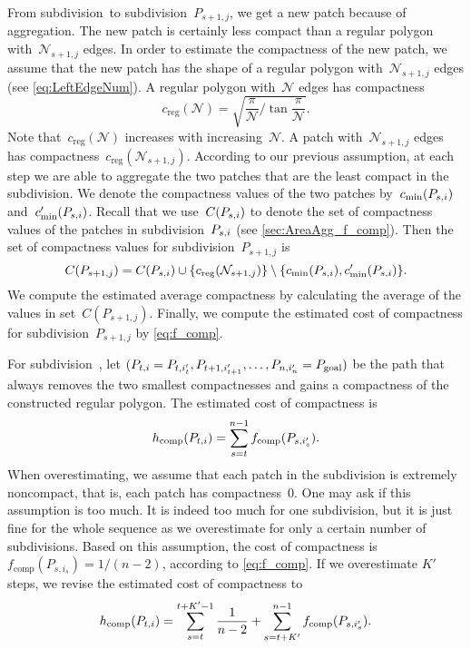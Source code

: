 From subdivision~\Psnode to subdivision~$P_{s+1,j}$,
we get a new patch because of aggregation.
The new patch is certainly less compact than a regular polygon 
with~$\mathcal{N}_{s+1,j}$ edges.
In order to estimate the compactness of the new patch, 
we assume that 
the new patch has the shape of a regular polygon 
with~$\mathcal{N}_{s+1,j}$ edges 
(see \eq\ref{eq:LeftEdgeNum}).
A regular polygon with~$\mathcal{N}$ edges has compactness
\begin{equation*}
\label{eq:comp_regular}
c_\mathrm{reg}(\mathcal{N})=
\sqrt{\frac{\pi}{\mathcal{N}} \bigg/
	\tan{\frac{\pi}{\mathcal{N}}}}.
\end{equation*}
Note that~$c_\mathrm{reg}(\mathcal{N})$ increases 
with increasing~$\mathcal{N}$.
A patch with~$\mathcal{N}_{s+1,j}$ edges has
compactness~$c_\mathrm{reg} (\mathcal{N}_{s+1,j})$.
According to our previous assumption, 
at each step we are able to aggregate the two patches 
that are the least compact in the subdivision.
We denote the compactness values of the two patches
by~$c_\mathrm{min}(P_{s,i})$ and~$c'_\mathrm{min}(P_{s,i})$.
Recall that we use~$C(P_{s,i})$ to denote 
the set of compactness values of the patches
in subdivision~$P_{s,i}$ 
(see \sect\ref{sec:AreaAgg_f_comp}).
Then the set of compactness values 
for subdivision~$P_{s+1,j}$ is 
\begin{equation}
\label{eq:compsetnew}
C(P_{s+1,j})=
C(P_{s,i})\cup 
\{c_\mathrm{reg} (\mathcal{N}_{s+1,j})\}
\setminus \{c_\mathrm{min}(P_{s,i}), c'_\mathrm{min}(P_{s,i})\}.
\nonumber
\end{equation}
We compute the estimated average compactness 
by calculating the average 
of the values in set~$C(P_{s+1,j})$.
Finally, we compute the estimated cost of compactness 
for subdivision~$P_{s+1,j}$ by \eq\ref{eq:f_comp}.

For subdivision~\Pnode, let
$(P_{t,i}=P_{t,i'_t}, P_{t+1,i'_{t+1}}, 
\dots,P_{n,i'_n}=P_\mathrm{goal})$
be the path that always removes the two smallest compactnesses
and gains a compactness of the constructed regular polygon.
The estimated cost of compactness is
\begin{equation}
\label{eq:h_comp}
h_\mathrm{comp}(P_{t,i})=
\sum_{s=t}^{n-1}f_\mathrm{comp}(P_{s,i'_s}). \nonumber
\end{equation}
When overestimating, we assume that 
each patch in the subdivision is extremely noncompact,
that is, each patch has compactness~$0$.
One may ask if this assumption is too much.
It is indeed too much for one subdivision, 
but it is just fine for the whole sequence
as we overestimate for only a certain number of subdivisions.
Based on this assumption,
the cost of compactness is $f_\mathrm{comp}(P_{s,i_s})=1/(n-2)$,
according to \eq\ref{eq:f_comp}.
If we overestimate $K'$ steps, 
we revise the estimated cost of compactness to
\begin{equation}
\label{eq:o_comp}
h_\mathrm{comp}(P_{t,i})=
\sum_{s=t}^{t+K'-1}\frac{1}{n-2}+
\sum_{s=t+K'}^{n-1}f_\mathrm{comp}(P_{s,i'_s}).
\end{equation}



